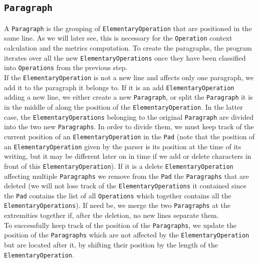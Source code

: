 \documentclass[a4, twocolumn, 12pt]{article}
\begin{document}
\subsection{\texttt{Paragraph}}
A \texttt{Paragraph} is the grouping of \texttt{ElementaryOperation} that are positioned in the same line. As we will later see, this is necessary for the \texttt{Operation} context calculation and the metrics computation. To create the paragraphs, the program iterates over all the new \texttt{ElementaryOperations} once they have been classified into \texttt{Operations} from the previous step. \\
If the \texttt{ElementaryOperation} is not a new line and affects only one paragraph, we add it to the paragraph it belongs to.
If it is an add \texttt{ElementaryOperation} adding a new line, we either create a new \texttt{Paragraph}, or split the \texttt{Paragraph} it is in the middle of along the position of the \texttt{ElementaryOperation}. In the latter case, the \texttt{ElementaryOperations} belonging to the original \texttt{Paragraph} are divided into the two new \texttt{Paragraphs}. In order to divide them, we must keep track of the current position of an \texttt{ElementaryOperation} in the \texttt{Pad} (note that the position of an \texttt{ElementaryOperation} given by the parser is its position at the time of its writing, but it may be different later on in time if we add or delete characters in front of this \texttt{ElementaryOperation}).
If it is a delete \texttt{ElementaryOperation} affecting multiple \texttt{Paragraphs} we remove from the \texttt{Pad} the \texttt{Paragraphs} that are deleted (we will not lose track of the \texttt{ElementaryOperations} it contained since the \texttt{Pad} contains the list of all \texttt{Operations} which together contains all the \texttt{ElementaryOperations}). If need be, we merge the two \texttt{Paragraphs} at the extremities together if, after the deletion, no new lines separate them.\\
To successfully keep track of the position of the \texttt{Paragraphs}, we update the position of the \texttt{Paragraphs} which are not affected by the \texttt{ElementaryOperation} but are located after it, by shifting their position by the length of the \texttt{ElementaryOperation}.
\end{document}
